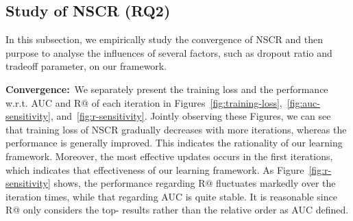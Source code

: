 \documentclass[sigconf]{acmart}
\newcommand{\wrt}{\emph{w.r.t. }}
\begin{document}
	\begin{figure*}[t]
		\centering
{}
		\vspace{-10pt}
		\caption{Training loss and recommendation performance regarding AUC and R@ \wrt the number of iterations.}
		\vspace{-1em}
		\label{fig:sensitivity-analysis}
	\end{figure*}
	
	\begin{figure*}[h]
		\centering
{}
		\vspace{-10pt}
		\caption{Performance comparison of AUC and R@ \wrt the dropout ratio  and tradeoff parameter  on Twitter-Trip and Facebook-Trip datasets.}
		\vspace{-1em}
		\label{fig:dropout-tradeoff}
	\end{figure*}
	
	\subsection{Study of NSCR (RQ2)}
	In this subsection, we empirically study the convergence of NSCR and then purpose to analyse the influences of several factors, such as dropout ratio and tradeoff parameter, on our framework.
	
	\textbf{Convergence:}~We separately present the training loss and the performance w.r.t. AUC and R@ of each iteration in Figures~\ref{fig:training-loss},~\ref{fig:auc-sensitivity}, and~\ref{fig:r-sensitivity}. Jointly observing these Figures, we can see that training loss of NSCR gradually decreases with more iterations, whereas the performance is generally improved. This indicates the rationality of our learning framework. Moreover, the most effective updates occurs in the first  iterations, which indicates that effectiveness of our learning framework. As Figure~\ref{fig:r-sensitivity} shows, the performance regarding R@ fluctuates markedly over the iteration times, while that regarding AUC is quite stable. It is reasonable since R@ only considers the top- results rather than the relative order as AUC defined.
	
\end{document}
